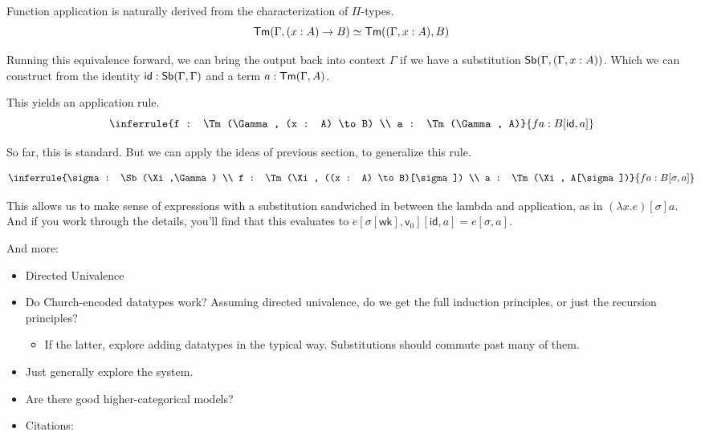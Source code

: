 \documentclass{article}
\begin{document}
Function application is naturally derived from the characterization of \(\Pi\)-types.
\[\mathsf{Tm}(\Gamma, (x : A) \to B) \simeq \mathsf{Tm}((\Gamma, x : A), B)\]

Running this equivalence forward, we can bring the output back into context \(\Gamma\)
if we have a substitution \(\mathsf{Sb}(\Gamma, (\Gamma, x : A))\).
Which we can construct from the identity \(\mathsf{id} : \mathsf{Sb}(\Gamma,\Gamma)\)
and a term \(a : \mathsf{Tm}(\Gamma, A)\).

This yields an application rule.
\[\inferrule{f : \Tm(\Gamma, (x : A) \to B) \\ a : \Tm(\Gamma, A)}{f a : B[\mathsf{id}, a]}\]

So far, this is standard. But we can apply the ideas of previous section, to generalize this rule.

\[\inferrule{\sigma : \Sb(\Xi,\Gamma) \\ f : \Tm(\Xi, ((x : A) \to B)[\sigma]) \\ a : \Tm(\Xi, A[\sigma])}{f a : B[\sigma, a]}\]

This allows us to make sense of expressions with a substitution sandwiched in between the lambda and application,
as in \((\lambda x. e)[\sigma] a\).
And if you work through the details, you'll find that this evaluates to \(e[\sigma[\mathsf{wk}],\mathsf{v}_0][\mathsf{id}, a] = e[\sigma, a]\).

\pagebreak

\listoftodos

\noindent And more:

\begin{itemize}
    \item Directed Univalence
    \item Do Church-encoded datatypes work? Assuming directed univalence, do we get the full induction principles, or just the recursion principles?
    \begin{itemize}
        \item If the latter, explore adding datatypes in the typical way. Substitutions should commute past many of them.
    \end{itemize}
    \item Just generally explore the system.
    \item Are there good higher-categorical models?
    \item Citations:
\end{itemize}

\printbibliography
\end{document}
